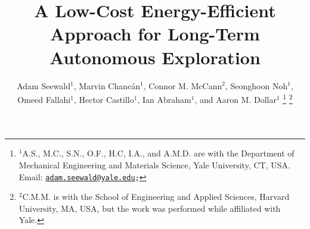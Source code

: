\documentclass[lettersize,journal,twoside]{IEEEtran}
\theoremstyle{definition}
\begin{document}

\title{A Low-Cost Energy-Efficient Approach for Long-Term %
Autonomous Exploration}%

\author{Adam Seewald${}^\text{1}$, Marvin Chanc{\'a}n${}^\text{1}$, Connor M. McCann${}^\text{2}$, Seonghoon Noh${}^\text{1}$, Omeed Fallahi${}^\text{1}$, Hector Castillo${}^\text{1}$, %
Ian Abraham${}^\text{1}$, and Aaron M. Dollar${}^\text{1}$%
  \thanks{${}^\text{1}$A.\hspace*{.4ex}S., M.\hspace*{.4ex}C., S.\hspace*{.4ex}N., O.\hspace*{.4ex}F., H.\hspace*{.4ex}C, I.\hspace*{.4ex}A., and A.\hspace*{.4ex}M.\hspace*{.4ex}D. are with the Department of Mechanical Engineering and Materials Science, Yale University, CT, USA. Email: {\tt\footnotesize \href{mailto:adam.seewald@yale.edu}{adam.seewald@yale.edu};}}
  \thanks{${}^\text{2}$C.\hspace*{.4ex}M.\hspace*{.4ex}M. is with the School of Engineering and Applied Sciences, Harvard University, MA, USA, but the work was performed while affiliated with Yale.}
}
\end{document}
